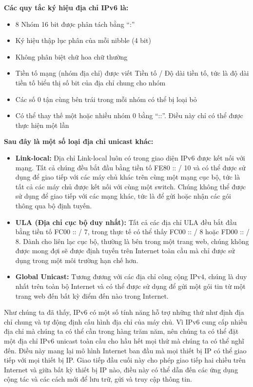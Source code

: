 \documentclass{report}
\begin{document}
\textbf{Các quy tắc ký hiệu địa chỉ IPv6 là:}
\begin{itemize}
	\item 8 Nhóm 16 bit được phân tách bằng “:”
	\item Ký hiệu thập lục phân của mỗi nibble (4 bit)
	\item Không phân biệt chữ hoa chữ thường
	\item Tiền tố mạng (nhóm địa chỉ) được viết Tiền tố / Độ dài tiền tố, tức là độ dài tiền tố biểu thị số bit của địa chỉ chung cho nhóm
	\item Các số 0 tận cùng bên trái trong mỗi nhóm có thể bị loại bỏ
	\item Có thể thay thế một hoặc nhiều nhóm 0 bằng “::”. Điều này chỉ có thể được thực hiện một lần
\end{itemize}
\textbf{Sau đây là một số loại địa chỉ unicast khác:}
\begin{itemize}
	\item \textbf{Link-local:} Địa chỉ Link-local luôn có trong giao diện IPv6 được kết nối với mạng. Tất cả chúng đều bắt đầu bằng tiền tố FE80 :: / 10 và có thể được sử dụng để giao tiếp với các máy chủ khác trên cùng một mạng cục bộ, tức là tất cả các máy chủ được kết nối với cùng một switch. Chúng không thể được sử dụng để giao tiếp với các mạng khác, tức là để gửi hoặc nhận các gói thông qua bộ định tuyến.
	\item \textbf{ULA (Địa chỉ cục bộ duy nhất):} Tất cả các địa chỉ ULA đều bắt đầu bằng tiền tố FC00 :: / 7, trong thực tế có thể thấy FC00 :: / 8 hoặc FD00 :: / 8. Dành cho liên lạc cục bộ, thường là bên trong một trang web, chúng không được mong đợi sẽ được định tuyến trên Internet toàn cầu mà chỉ được sử dụng trong một môi trường hạn chế hơn.
	\item \textbf{Global Unicast:} Tương đương với các địa chỉ công cộng IPv4, chúng là duy nhất trên toàn bộ Internet và có thể được sử dụng để gửi một gói tin từ một trang web đến bất kỳ điểm đến nào trong Internet.
\end{itemize}

Như chúng ta đã thấy, IPv6 có một số tính năng hỗ trợ những thứ như định địa chỉ chung và tự động định cấu hình địa chỉ của máy chủ. Vì IPv6 cung cấp nhiều địa chỉ mà chúng ta có thể cần trong hàng trăm năm, nên chúng ta có thể đặt một địa chỉ IPv6 unicast toàn cầu cho hầu hết mọi thứ mà chúng ta có thể nghĩ đến. Điều này mang lại mô hình Internet ban đầu mà mọi thiết bị IP có thể giao tiếp với mọi thiết bị IP. Giao tiếp đầu cuối này cho phép giao tiếp hai chiều trên Internet và giữa bất kỳ thiết bị IP nào, điều này có thể dẫn đến các ứng dụng cộng tác và các cách mới để lưu trữ, gửi và truy cập thông tin.
\end{document}
